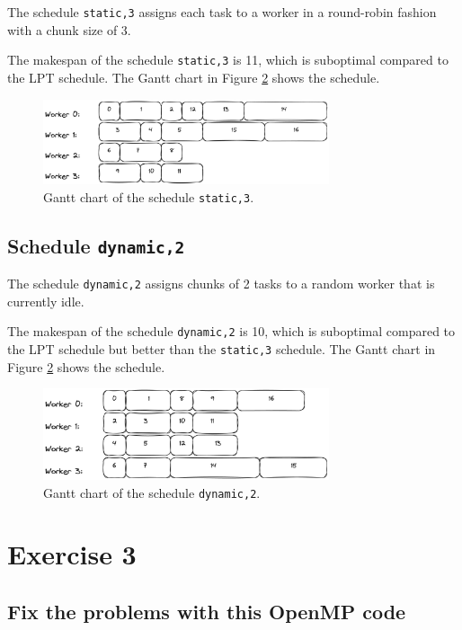\documentclass[a4paper,%
7pt,%
DIV12,
headsepline,%
headings=normal,
]{scrartcl}
\begin{document}
The schedule \texttt{static,3} assigns each task to a worker in a round-robin fashion with a chunk size of 3.

The makespan of the schedule \texttt{static,3} is 11, which is suboptimal compared to the LPT schedule. The Gantt chart in Figure \ref{fig:gantt_static3} shows the schedule.

\begin{figure}[htbp]
    \centering
    \includegraphics[width=0.75\textwidth]{./assets/static3.png}
    \caption{Gantt chart of the schedule \texttt{static,3}.}
    \label{fig:gantt_static3}
\end{figure}

\subsection{Schedule \texttt{dynamic,2}}

The schedule \texttt{dynamic,2} assigns chunks of 2 tasks to a random worker that is currently idle.

The makespan of the schedule \texttt{dynamic,2} is 10, which is suboptimal compared to the LPT schedule but better than the \texttt{static,3} schedule. The Gantt chart in Figure \ref{fig:gantt_static3} shows the schedule.

\begin{figure}[htbp]
    \centering
    \includegraphics[width=0.75\textwidth]{./assets/dynamic2.png}
    \caption{Gantt chart of the schedule \texttt{dynamic,2}.}
    \label{fig:gantt_static3}
\end{figure}

\section{Exercise 3}

\subsection{Fix the problems with this OpenMP code}
\end{document}
